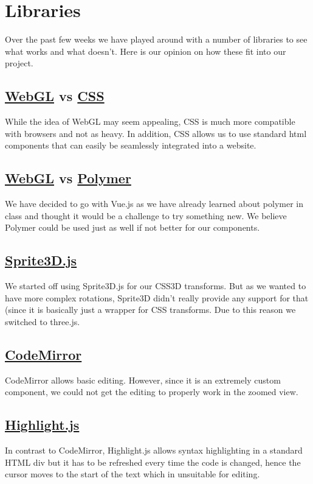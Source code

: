 \documentclass[a4paper]{article}
\begin{document}
\section{Libraries}
Over the past few weeks we have played around with a number of libraries to see what works and what doesn't. Here is our opinion on how these fit into our project.
\subsection{\href{https://get.webgl.org/}{WebGL} vs \href{https://developer.mozilla.org/en-US/docs/Web/CSS}{CSS}}
While the idea of WebGL may seem appealing, CSS is much more compatible with browsers and not as heavy. In addition, CSS allows us to use standard html components that can easily be seamlessly integrated into a website.
\subsection{\href{https://vuejs.org/}{WebGL}  vs \href{https://www.polymer-project.org/1.0/}{Polymer}}
We have decided to go with Vue.js as we have already learned about polymer in class and thought it would be a challenge to try something new. We believe Polymer could be used just as well if not better for our components.
\subsection{\href{http://minimal.be/lab/Sprite3D/}{Sprite3D.js}}
We started off using Sprite3D.js for our CSS3D transforms. But as we wanted to have more complex rotations, Sprite3D didn't really provide any support for that (since it is basically just a wrapper for CSS transforms.
Due to this reason we   switched to three.js.
\subsection{\href{https://codemirror.net/}{CodeMirror}}
CodeMirror allows basic editing. However, since it is an extremely custom component, we could not get the editing to properly work in the zoomed view.
\subsection{\href{https://highlightjs.org/}{Highlight.js}}
In contrast to CodeMirror, Highlight.js allows syntax highlighting in a standard HTML div but it has to be refreshed every time the code is changed, hence the cursor moves to the start of the text which in unsuitable for editing.
\end{document}
